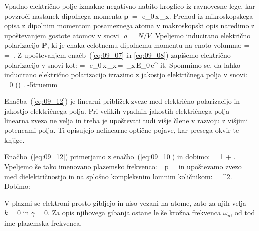 Vpadno električno polje izmakne negativno nabito kroglico iz ravnovesne 
lege, kar povzroči nastanek dipolnega momenta $\mathbf{p}$:
\beq
{} = -e_0\,x\,_x.
\label{eq:09_08}
\eeq
Prehod iz mikroskopskega opisa z dipolnim momentom posameznega atoma 
v makroskopski opis naredimo z upoštevanjem gostote atomov v snovi 
$\varrho = N/V$. Vpeljemo inducirano električno polarizacijo $\mathbf{P}$, ki 
je enaka celotnemu dipolnemu momentu na enoto volumna:
\beq
{} =  = \,\varrho. 
\label{eq:09_09}
\eeq
Z upoštevanjem enačb~(\ref{eq:09_07} in \ref{eq:09_08}) zapišemo 
električno polarizacijo v snovi kot:
\beq
{} = -e_0\,x\,_x\,\varrho = \,_x\,E_0\,e^{-i\omega t}.
\label{eq:09_10}
\eeq
Spomnimo se, da lahko inducirano električno polarizacijo izrazimo z jakostjo
električnega polja v snovi:
\beq
{} = \varepsilon_0 () .
\label{eq:09_12}
\eeq
\vglue-5truemm
\begin{remark}
Enačba~(\ref{eq:09_12}) je linearni približek zveze med električno polarizacijo in 
jakostjo električnega polja. Pri velikih vpadnih jakostih električnega polja linearna zveza 
ne velja in treba je upoštevati tudi višje člene v razvoju z višjimi potencami polja. Ti
opisujejo nelinearne optične pojave, kar presega okvir te knjige.
\end{remark}

Enačbo~(\ref{eq:09_12}) primerjamo z enačbo~(\ref{eq:09_10}) in dobimo:
\beq
\varepsilon= 1 + .
\label{eq:09_13}
\eeq
Vpeljemo še tako imenovano plazemsko frekvenco:
\beq
\omega_p = 
\label{eq:09_14}
\eeq
in upoštevamo zvezo med dielektričnostjo in na splošno kompleksnim lomnim količnikom:
\beq
\varepsilon = ^2.
\label{eq:09_15}
\eeq
Dobimo:
\begin{remark}
V plazmi se elektroni prosto gibljejo in niso vezani na atome,
zato za njih velja $k=0$ in $\gamma = 0$. Za opis njihovega
gibanja ostane le še krožna frekvenca $\omega_p$, od tod ime plazemska frekvenca.
\end{remark}

